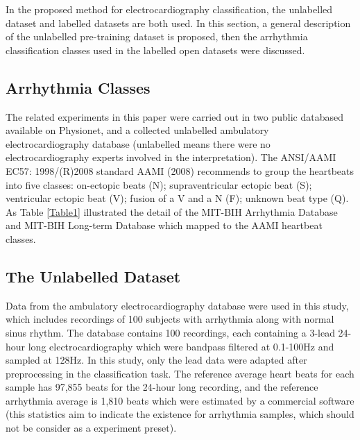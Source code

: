 \documentclass[journal]{IEEEtran}
\begin{document}
In the proposed method for electrocardiography classification, the unlabelled dataset and labelled datasets are both used. In this section, a general description of the unlabelled pre-training dataset is proposed, then the arrhythmia classification classes used in the labelled open datasets were discussed.



\subsection{Arrhythmia Classes}
The related experiments in this paper were carried out in two public databased available on Physionet, and a collected unlabelled ambulatory electrocardiography database (unlabelled means there were no electrocardiography experts involved in the interpretation). 
The ANSI/AAMI EC57: 1998/(R)2008 standard AAMI (2008) recommends to group the heartbeats into five classes: on-ectopic beats (N); supraventricular ectopic beat (S); ventricular ectopic beat (V); fusion of a V and a N (F); unknown beat type (Q).
As Table \ref{Table1} illustrated the detail of the MIT-BIH Arrhythmia Database and MIT-BIH Long-term Database which mapped to the AAMI heartbeat classes.


\subsection{The Unlabelled Dataset}
Data from the ambulatory electrocardiography database were used in this study, which includes recordings of 100 subjects with arrhythmia along with normal sinus rhythm. The database contains 100 recordings, each containing a 3-lead 24-hour long electrocardiography which were bandpass filtered at 0.1-100Hz and sampled at 128Hz. In this study, only the lead \uppercase\expandafter{} data were adapted after preprocessing in the classification task. The reference average heart beats for each sample has 97,855 beats for the 24-hour long recording, and the reference arrhythmia average is 1,810 beats which were estimated by a commercial software (this statistics aim to indicate the existence for arrhythmia samples, which should not be consider as a experiment preset).
\end{document}
